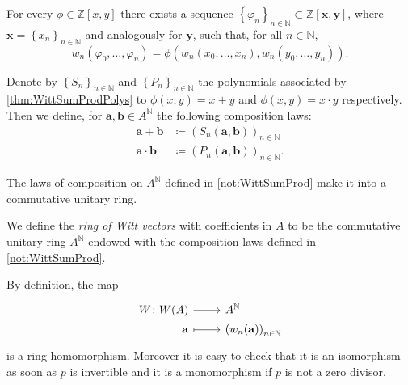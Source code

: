 \begin{lem}\label{thm:WittSumProdPolys}
	For every $\phi \in \mathbb{Z}[x,y]$ there exists a sequence
	$\left\{ \varphi_n \right\}_{n \in \mathbb{N}} \subset \mathbb{Z}[\mathbf{x}, \mathbf{y}]$,
	where $\mathbf{x} = \left\{ x_n \right\}_{n \in \mathbb{N}}$
	and analogously for $\mathbf{y}$, such that,
	for all $n \in \mathbb{N}$,
	\begin{equation*}
		w_n(\varphi_0, \ldots, \varphi_n) =
		\phi \left( w_n(x_0, \ldots, x_n), w_n(y_0, \ldots, y_n) \right)
	.\end{equation*}
\end{lem} 


\begin{ntt}[]\label{not:WittSumProd}
	Denote by $\left\{ S_n \right\}_{n \in \mathbb{N}}$ and
	$\left\{ P_n \right\}_{n \in \mathbb{N}}$ the polynomials associated 
	by \cref{thm:WittSumProdPolys} to 
	$\phi(x,y) = x + y$ and $\phi(x,y) = x \cdot y$ respectively.
	Then we define, for $\mathbf{a},\mathbf{b} \in A^{\mathbb{N}}$ the following
	composition laws:
	\begin{align*}
		\mathbf{a} + \mathbf{b} &\coloneqq
		\left( S_n(\mathbf{a},\mathbf{b}) \right)_{n \in \mathbb{N}}\\
		\mathbf{a} \cdot \mathbf{b} &\coloneqq 
		\left( P_n(\mathbf{a},\mathbf{b}) \right)_{n \in \mathbb{N}}
	.\end{align*}
\end{ntt}


\begin{thm}
	The laws of composition on $A^{\mathbb{N}}$ defined in \cref{not:WittSumProd}
	make it into a commutative unitary ring.
\end{thm}


\begin{defn}
	We define the {\em ring of Witt vectors} with coefficients in $A$
	to be the commutative unitary ring $A^{\mathbb{N}}$ endowed with
	the composition laws defined in \cref{not:WittSumProd}.
\end{defn}


\begin{rem}[]
	By definition, the map
	\begin{equation*}
	\begin{tikzcd}[row sep = 0ex
		,/tikz/column 1/.append style={anchor=base east}
		,/tikz/column 2/.append style={anchor=base west}]
		W\colon W(A) \arrow[r, "", rightarrow] &
		A^{\mathbb{N}} \\
		\mathbf{a} \arrow[r, "", mapsto] & 
		\left( w_n(\mathbf{a}) \right)_{n \in \mathbb{N}}
	\end{tikzcd}
	\end{equation*} 
	is a ring homomorphism.
	Moreover it is easy to check that it is an isomorphism as soon
	as $p$ is invertible and it is a monomorphism if $p$ is not a zero divisor.
\end{rem}


